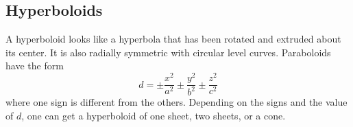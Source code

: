 \subsection{Hyperboloids}
\noindent
A hyperboloid looks like a hyperbola that has been rotated and extruded about its center. It is also radially symmetric with circular level curves. Paraboloids have the form 
\begin{equation*}
	d = \pm \frac{x^2}{a^2} \pm \frac{y^2}{b^2} \pm \frac{z^2}{c^2}	
\end{equation*}
where one sign is different from the others. Depending on the signs and the value of $d$, one can get a hyperboloid of one sheet, two sheets, or a cone.


